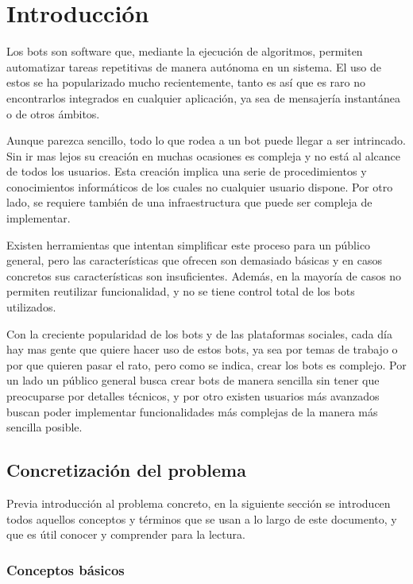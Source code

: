 \chapter{Introducción}

Los bots son software que, mediante la ejecución de algoritmos, permiten automatizar tareas repetitivas de manera autónoma en un sistema. El uso de estos se ha popularizado mucho recientemente, tanto es así que es raro no encontrarlos integrados en cualquier aplicación, ya sea de mensajería instantánea o de otros ámbitos.

Aunque parezca sencillo, todo lo que rodea a un bot puede llegar a ser intrincado. Sin ir mas lejos su creación en muchas ocasiones es compleja y no está al alcance de todos los usuarios. Esta creación implica una serie de procedimientos y conocimientos informáticos de los cuales no cualquier usuario dispone. Por otro lado, se requiere también de una infraestructura que puede ser compleja de implementar.

Existen herramientas que intentan simplificar este proceso para un público general, pero las características que ofrecen son demasiado básicas y en casos concretos sus características son insuficientes. Además, en la mayoría de casos no permiten reutilizar funcionalidad, y no se tiene control total de los bots utilizados.

Con la creciente popularidad de los bots y de las plataformas sociales, cada día hay mas gente que quiere hacer uso de estos bots, ya sea por temas de trabajo o por que quieren pasar el rato, pero como se indica, crear los bots es complejo. Por un lado un público general busca crear bots de manera sencilla sin tener que preocuparse por detalles técnicos, y por otro existen usuarios más avanzados buscan poder implementar funcionalidades más complejas de la manera más sencilla posible.

\section{Concretización del problema}

Previa introducción al problema concreto, en la siguiente sección se introducen todos aquellos conceptos y términos que se usan a lo largo de este documento, y que es útil conocer y comprender para la lectura.

\subsection{Conceptos básicos}

